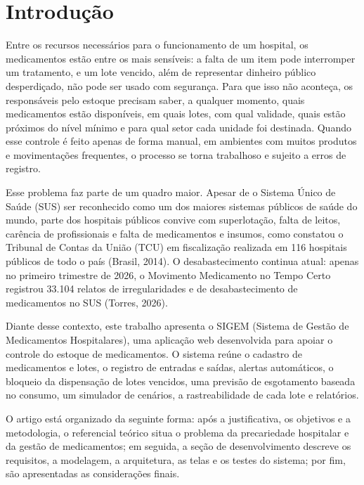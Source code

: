 \documentclass[12pt,a4paper]{article}
\begin{document}
\vspace{0.4cm}

\section{Introdução}

Entre os recursos necessários para o funcionamento de um hospital, os medicamentos estão entre os mais sensíveis: a falta de um item pode interromper um tratamento, e um lote vencido, além de representar dinheiro público desperdiçado, não pode ser usado com segurança. Para que isso não aconteça, os responsáveis pelo estoque precisam saber, a qualquer momento, quais medicamentos estão disponíveis, em quais lotes, com qual validade, quais estão próximos do nível mínimo e para qual setor cada unidade foi destinada. Quando esse controle é feito apenas de forma manual, em ambientes com muitos produtos e movimentações frequentes, o processo se torna trabalhoso e sujeito a erros de registro.

Esse problema faz parte de um quadro maior. Apesar de o Sistema Único de Saúde (SUS) ser reconhecido como um dos maiores sistemas públicos de saúde do mundo, parte dos hospitais públicos convive com superlotação, falta de leitos, carência de profissionais e falta de medicamentos e insumos, como constatou o Tribunal de Contas da União (TCU) em fiscalização realizada em 116 hospitais públicos de todo o país (Brasil, 2014). O desabastecimento continua atual: apenas no primeiro trimestre de 2026, o Movimento Medicamento no Tempo Certo registrou 33.104 relatos de irregularidades e de desabastecimento de medicamentos no SUS (Torres, 2026).

Diante desse contexto, este trabalho apresenta o SIGEM (Sistema de Gestão de Medicamentos Hospitalares), uma aplicação web desenvolvida para apoiar o controle do estoque de medicamentos. O sistema reúne o cadastro de medicamentos e lotes, o registro de entradas e saídas, alertas automáticos, o bloqueio da dispensação de lotes vencidos, uma previsão de esgotamento baseada no consumo, um simulador de cenários, a rastreabilidade de cada lote e relatórios.

O artigo está organizado da seguinte forma: após a justificativa, os objetivos e a metodologia, o referencial teórico situa o problema da precariedade hospitalar e da gestão de medicamentos; em seguida, a seção de desenvolvimento descreve os requisitos, a modelagem, a arquitetura, as telas e os testes do sistema; por fim, são apresentadas as considerações finais.
\end{document}
